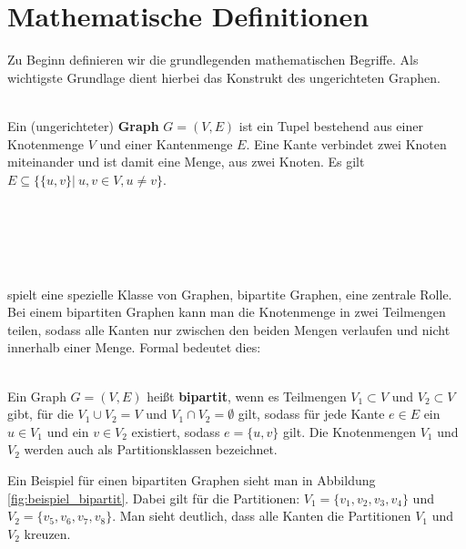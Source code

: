 



\section{Mathematische Definitionen}
Zu Beginn definieren wir die grundlegenden mathematischen Begriffe. Als wichtigste Grundlage dient 
hierbei das Konstrukt des ungerichteten Graphen.
\begin{definition}[Graph] ~\\
Ein (ungerichteter) \textbf{Graph} $G = (V,E)$ ist ein Tupel bestehend aus einer Knotenmenge $V$ und einer Kantenmenge
 $E$. Eine Kante verbindet zwei Knoten miteinander und ist damit eine Menge, aus zwei Knoten.
 Es gilt $E \subseteq \{ \{u,v\} |\ u,v \in V, u \neq v \}$.  
\end{definition}
\begin{definition}[Multigraph] ~\\
\\
\\
\\
\end{definition}
 spielt eine spezielle Klasse von Graphen, bipartite Graphen, eine zentrale Rolle.
Bei einem bipartiten Graphen kann man die Knotenmenge in zwei Teilmengen teilen, sodass alle Kanten nur zwischen den 
beiden Mengen verlaufen und nicht innerhalb einer Menge. Formal bedeutet dies:
\begin{definition} ~\\
Ein Graph $G=(V,E)$ heißt \textbf{bipartit}, wenn es Teilmengen $V_1 \subset V$ und $V_2 \subset V$ gibt, für die 
$V_1 \cup V_2 = V$ und $V_1 \cap V_2 = \emptyset$ gilt,
 sodass für jede Kante $e \in E$ ein $u \in V_1$ und ein $v \in V_2$ existiert, sodass $e = \{u,v\}$ gilt.
Die Knotenmengen $V_1$ und $V_2$ werden auch als Partitionsklassen bezeichnet.
\end{definition}

\noindent
Ein Beispiel für einen bipartiten Graphen sieht man in Abbildung \ref{fig:beispiel_bipartit}. Dabei gilt für die Partitionen:
$V_1 = \{v_1,v_2,v_3,v_4\}$ und $V_2 = \{v_5,v_6,v_7,v_8\}$. Man sieht deutlich, dass alle Kanten die Partitionen
$V_1$ und $V_2$ \glqq kreuzen\grqq.

